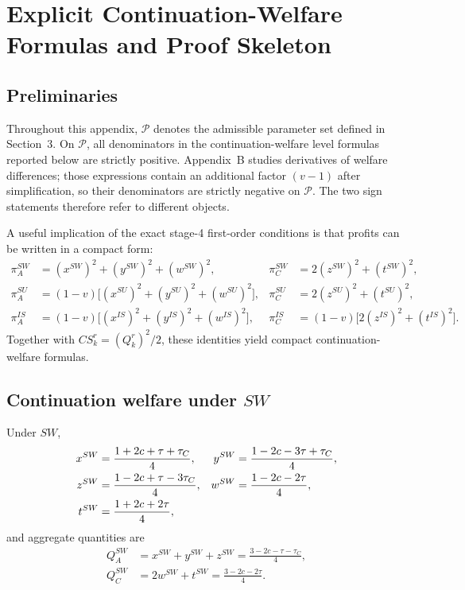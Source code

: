 \appendix
\section{Explicit Continuation-Welfare Formulas and Proof Skeleton}

\subsection{Preliminaries}

Throughout this appendix, $\mathcal P$ denotes the admissible parameter set
defined in Section~3. On $\mathcal P$, all denominators in the
continuation-welfare level formulas reported below are strictly positive.
Appendix~B studies derivatives of welfare differences; those expressions
contain an additional factor $(v-1)$ after simplification, so their
denominators are strictly negative on $\mathcal P$. The two sign statements
therefore refer to different objects.

A useful implication of the exact stage-4 first-order conditions is that profits can be written in a compact form:
\begin{align}
\pi_A^{SW} &= (x^{SW})^2+(y^{SW})^2+(w^{SW})^2, &
\pi_C^{SW} &= 2(z^{SW})^2+(t^{SW})^2, \label{eq:profit_id_sw}\\
\pi_A^{SU} &= (1-v)\Big[(x^{SU})^2+(y^{SU})^2+(w^{SU})^2\Big], &
\pi_C^{SU} &= 2(z^{SU})^2+(t^{SU})^2, \label{eq:profit_id_su}\\
\pi_A^{IS} &= (1-v)\Big[(x^{IS})^2+(y^{IS})^2+(w^{IS})^2\Big], &
\pi_C^{IS} &= (1-v)\Big[2(z^{IS})^2+(t^{IS})^2\Big]. \label{eq:profit_id_is}
\end{align}
Together with $CS_k^r=(Q_k^r)^2/2$, these identities yield compact continuation-welfare formulas.

\subsection{Continuation welfare under \texorpdfstring{$SW$}{SW}}

Under $SW$,
\begin{align}
x^{SW} &= \frac{1+2c+\tau+\tau_C}{4}, &
y^{SW} &= \frac{1-2c-3\tau+\tau_C}{4}, \notag\\
z^{SW} &= \frac{1-2c+\tau-3\tau_C}{4}, &
w^{SW} &= \frac{1-2c-2\tau}{4}, \notag\\
t^{SW} &= \frac{1+2c+2\tau}{4}, \label{eq:sw_outputs_appendix}
\end{align}
and aggregate quantities are
\begin{align}
Q_A^{SW} &= x^{SW}+y^{SW}+z^{SW}
= \frac{3-2c-\tau-\tau_C}{4}, \label{eq:QA_sw_appendix}\\
Q_C^{SW} &= 2w^{SW}+t^{SW}
= \frac{3-2c-2\tau}{4}. \label{eq:QC_sw_appendix}
\end{align}

